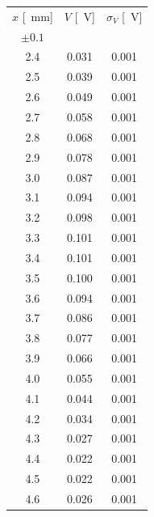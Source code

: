 \documentclass[10pt,oneside,a4paper]{article}
\begin{document}
\begin{minipage}{0.33\linewidth}
\begin{center}
\begin{tabular}{c|c|c}
$x$ [\SI{}{mm}] & $V$ [\SI{}{V}] & $\sigma_V$ [\SI{}{V}] \\
 $\pm 0.1$ & & \\
\hline
  2.4 & 0.031 & 0.001 \\
  2.5 & 0.039 & 0.001 \\
  2.6 & 0.049 & 0.001 \\
  2.7 & 0.058 & 0.001 \\
  2.8 & 0.068 & 0.001 \\
  2.9 & 0.078 & 0.001 \\
  3.0 & 0.087 & 0.001 \\
  3.1 & 0.094 & 0.001 \\
  3.2 & 0.098 & 0.001 \\
  3.3 & 0.101 & 0.001 \\
  3.4 & 0.101 & 0.001 \\
  3.5 & 0.100 & 0.001 \\
  3.6 & 0.094 & 0.001 \\
  3.7 & 0.086 & 0.001 \\
  3.8 & 0.077 & 0.001 \\
  3.9 & 0.066 & 0.001 \\
  4.0 & 0.055 & 0.001 \\
  4.1 & 0.044 & 0.001 \\
  4.2 & 0.034 & 0.001 \\
  4.3 & 0.027 & 0.001 \\
  4.4 & 0.022 & 0.001 \\
  4.5 & 0.022 & 0.001 \\
  4.6 & 0.026 & 0.001 \\
\hline
\end{tabular}
\end{center}
\end{minipage}
\end{document}
